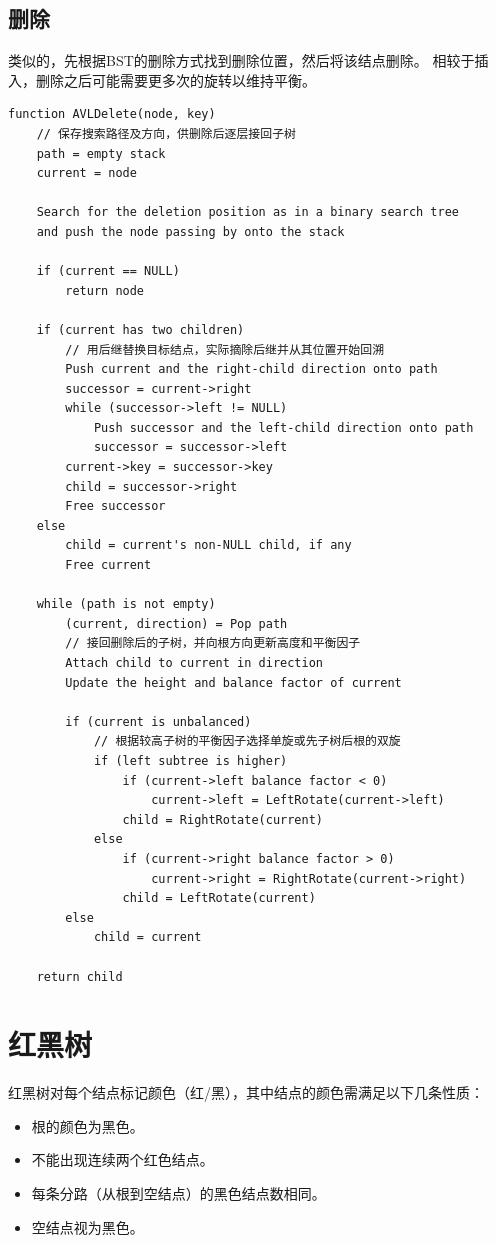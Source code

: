 \documentclass[openany]{book}
\begin{document}
\subsection{删除}
类似的，先根据BST的删除方式找到删除位置，然后将该结点删除。
相较于插入，删除之后可能需要更多次的旋转以维持平衡。
\begin{lstlisting}
function AVLDelete(node, key)
    // 保存搜索路径及方向，供删除后逐层接回子树
    path = empty stack
    current = node

    Search for the deletion position as in a binary search tree
    and push the node passing by onto the stack

    if (current == NULL)
        return node

    if (current has two children)
        // 用后继替换目标结点，实际摘除后继并从其位置开始回溯
        Push current and the right-child direction onto path
        successor = current->right
        while (successor->left != NULL)
            Push successor and the left-child direction onto path
            successor = successor->left
        current->key = successor->key
        child = successor->right
        Free successor
    else
        child = current's non-NULL child, if any
        Free current

    while (path is not empty)
        (current, direction) = Pop path
        // 接回删除后的子树，并向根方向更新高度和平衡因子
        Attach child to current in direction
        Update the height and balance factor of current

        if (current is unbalanced)
            // 根据较高子树的平衡因子选择单旋或先子树后根的双旋
            if (left subtree is higher)
                if (current->left balance factor < 0)
                    current->left = LeftRotate(current->left)
                child = RightRotate(current)
            else
                if (current->right balance factor > 0)
                    current->right = RightRotate(current->right)
                child = LeftRotate(current)
        else
            child = current

    return child
\end{lstlisting}

\section{红黑树}
红黑树对每个结点标记颜色（红/黑），其中结点的颜色需满足以下几条性质：
\begin{itemize}
    \item 根的颜色为黑色。
    \item 不能出现连续两个红色结点。
    \item 每条分路（从根到空结点）的黑色结点数相同。
    \item 空结点视为黑色。
\end{itemize}
\end{document}
